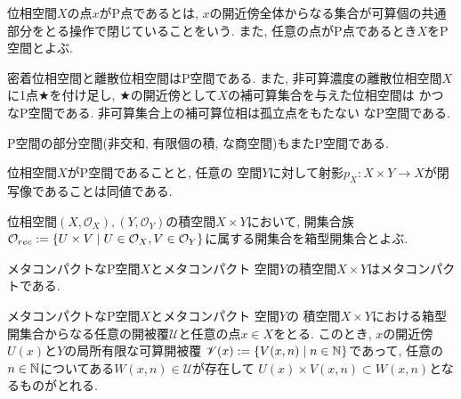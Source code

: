 \documentclass[uplatex, dvipdfmx, a4paper, 12pt, class=jsbook, crop=false]{standalone}
\begin{document}
\begin{definition}
	位相空間$ X $の点$ x $がP点であるとは, 
	$ x $の開近傍全体からなる集合が可算個の共通部分をとる操作で閉じていることをいう. 
	また, 任意の点がP点であるとき$ X $をP空間とよぶ.
\end{definition}

密着位相空間と離散位相空間はP空間である. また, 非可算濃度の離散位相空間$ X $に1点$ \bigstar $を付け足し, 
$ \bigstar $の開近傍として$ X $の補可算集合を与えた位相空間は \Hausdorff かつ \Lindelof なP空間である. 
非可算集合上の補可算位相は孤立点をもたない  なP空間である.

\begin{proposition}
	P空間の部分空間(非交和, 有限個の積, な商空間)もまたP空間である.
\end{proposition}

\begin{proposition}
	位相空間$ X $がP空間であることと, 
	任意の \Lindelof 空間$ Y $に対して射影$ p_X \colon X \times Y \to X $が閉写像であることは同値である.
\end{proposition}




\begin{definition}
	位相空間$ (X, \mathcal{O}_X), (Y, \mathcal{O}_Y) $の積空間$ X \times Y $において, 
	開集合族$ \mathcal{O}_{rec} \defeq \setcomp{U \times V}{U \in \mathcal{O}_X, V \in \mathcal{O}_Y} $に属する開集合を箱型開集合とよぶ.
\end{definition}

\begin{proposition}
	\label{prop:A product of a MetaCpt P space and a MetaCpt Lindelof space is MetaCpt}
	メタコンパクトなP空間$ X $とメタコンパクト \Lindelof 空間$ Y $の積空間$ X \times Y $はメタコンパクトである.
\end{proposition}

\begin{lemma}
	\label{Lemma1 for the statement on the metacompactness of the product space of a MetaCpt P-space and a ParaCpt Lindelof space}	
	メタコンパクトなP空間$ X $とメタコンパクト \Lindelof 空間$ Y $の
	積空間$ X \times Y $における箱型開集合からなる任意の開被覆$ \mathscr{U} $と任意の点$ x \in X $をとる. 
	このとき, $ x $の開近傍$ U(x) $と$ Y $の局所有限な可算開被覆
	$ \mathscr{V}(x) \defeq \setcomp{V(x, n)}{n \in \N} $であって, 
	任意の$ n \in \mathbb{N} $についてある$ W(x, n) \in \mathscr{U} $が存在して
	$ U(x) \times V(x, n) \subset W(x, n) $となるものがとれる.
\end{lemma}
\end{document}
